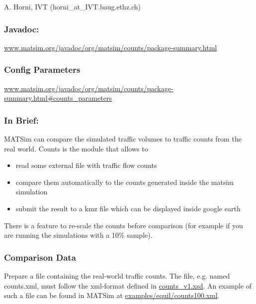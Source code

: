 \documentclass[a4paper,11pt]{report}
\begin{document}
A. Horni, IVT (horni\_at\_IVT.baug.ethz.ch)

\subsubsection{\textbf{\textbf{Javadoc:
\\}}}

\href{http://www.matsim.org/javadoc/org/matsim/counts/package-summary.html}{www.matsim.org/javadoc/org/matsim/counts/package-summary.html}


\subsubsection{\textbf{\textbf{Config Parameters{}}}}

\href{http://www.matsim.org/javadoc/org/matsim/counts/package-summary.html#counts_parameters}{www.matsim.org/javadoc/org/matsim/counts/package-summary.html\#counts\_parameters}

\subsubsection{\textbf{In Brief:}}

MATSim can compare the simulated traffic volumes to traffic counts from the real world. Counts is the module that allows to
\begin{itemize}
	\item read some external file with traffic flow counts
	\item compare them automatically to the counts generated inside the matsim simulation
	\item submit the result to a kmz file which can be displayed inside google earth
\end{itemize}

There is a feature to re-scale the counts before comparison (for example if you are running the simulations with a 10\% sample).

\subsubsection{Comparison Data}

Prepare a file containing the real-world traffic counts. The file, e.g. named counts.xml, must follow the xml-format defined in \href{http://matsim.org/files/dtd/counts_v1.xsd}{counts\_v1.xsd}. An example of such a file can be found in MATSim at \href{http://matsim.svn.sourceforge.net/viewvc/matsim/matsim/trunk/examples/equil/counts100.xml?content-type=text%2Fplain}{examples/equil/counts100.xml}.
\end{document}
